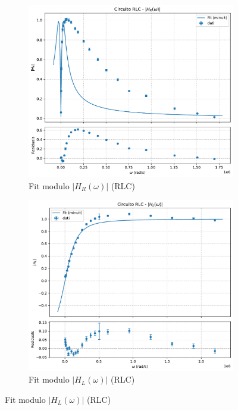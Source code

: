 \documentclass[a4paper]{article}
\begin{document}
\begin{figure}[htbp] %
    \centering %

    \begin{subfigure}[b]{0.495\textwidth} %
        \centering
        \includegraphics[width=\linewidth]{grafici/rlc_hr.pdf}
        \caption{Fit modulo $|H_R(\omega)|$ (RLC)}
        \label{fig:rlc_hr}
    \end{subfigure}
    \hfill %
    \begin{subfigure}[b]{0.495\textwidth}
        \centering
        \includegraphics[width=\linewidth]{grafici/rlc_hl.pdf}
        \caption{Fit modulo $|H_L(\omega)|$ (RLC)}
        \label{fig:rlc_hl}
    \end{subfigure}


\end{figure}
\end{document}
